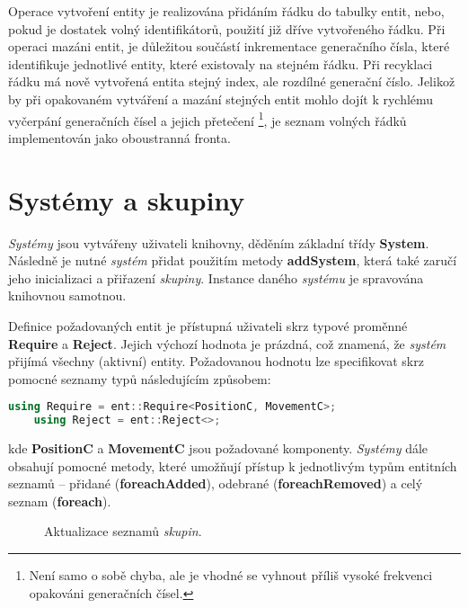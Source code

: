 Operace vytvoření entity je realizována přidáním řádku do tabulky entit, nebo, pokud je dostatek volný identifikátorů, použití již dříve vytvořeného řádku. Při operaci mazáni entit, je důležitou součástí inkrementace generačního čísla, které identifikuje jednotlivé entity, které existovaly na stejném řádku. Při recyklaci řádku má nově vytvořená entita stejný index, ale rozdílné generační číslo. Jelikož by při opakovaném vytváření a mazání stejných entit mohlo dojít k rychlému vyčerpání generačních čísel a jejich přetečení \footnote{Není samo o sobě chyba, ale je vhodné se vyhnout příliš vysoké frekvenci opakováni generačních čísel.}, je seznam volných řádků implementován jako oboustranná fronta.

\section{Systémy a skupiny}
\label{Chap:ImplSystem}

\emph{Systémy} jsou vytvářeny uživateli knihovny, děděním základní třídy \textbf{System}. Následně je nutné \emph{systém} přidat použitím metody \textbf{addSystem}, která také zaručí jeho inicializaci a přiřazení \emph{skupiny}. Instance daného \emph{systému} je spravována knihovnou samotnou.

Definice požadovaných entit je přístupná uživateli skrz typové proměnné \textbf{Require} a \textbf{Reject}. Jejich výchozí hodnota je prázdná, což znamená, že \emph{systém} přijímá všechny (aktivní) entity. Požadovanou hodnotu lze specifikovat skrz pomocné seznamy typů následujícím způsobem: 

\begin{lstlisting}[language=C++]
	using Require = ent::Require<PositionC, MovementC>;
	using Reject = ent::Reject<>;
\end{lstlisting}

\noindent kde \textbf{PositionC} a \textbf{MovementC} jsou požadované komponenty. \emph{Systémy} dále obsahují pomocné metody, které umožňují přístup k jednotlivým typům entitních seznamů -- přidané (\textbf{foreachAdded}), odebrané (\textbf{foreachRemoved}) a celý seznam (\textbf{foreach}). 

\begin{figure}[H]
	\begin{center}
	\end{center}
	\caption{Aktualizace seznamů \emph{skupin}.}
	\label{Fig:IMPLMerge}
\end{figure}

